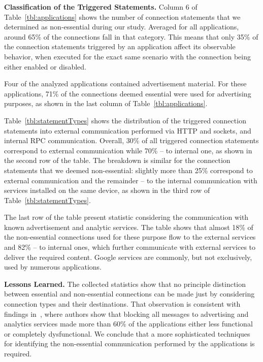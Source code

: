 \vspace{0.1in}
\noindent 
{\bf Classification of the Triggered Statements.}
Column 6 of Table~\ref{tbl:applications} shows the number of connection statements that we determined as non-essential during our study. 
Averaged for all applications, around 65\% of the connections fall in that category. 
This means that only 35\% of the connection statements triggered by an application affect its observable behavior, 
when executed for the exact same scenario with the connection being either enabled or disabled. 

Four of the analyzed applications contained advertisement material. For these applications, 71\% of the connections deemed  essential were used for advertising purposes, as shown in the last column of Table~\ref{tbl:applications}.



Table~\ref{tbl:statementTypes} shows the distribution of the triggered connection statements 
into external communication performed via HTTP and sockets, and internal RPC communication. 
Overall, 30\% of all triggered connection statements correspond to external communication while 70\% -- to
internal one, as shown in the second row of the table.
The breakdown is similar for the connection statements that we deemed non-essential: slightly more than 25\%
correspond to external communication and the remainder -- to the internal communication with services installed on the same device, as shown in the third row of Table~\ref{tbl:statementTypes}.

The last row of the table present statistic considering the communication with known advertisement and analytic services. The table shows that almost 18\% of the non-essential connections used for these purpose flow to the external services and 82\% -- to internal ones, which further communicate with external services to deliver the required content. 
Google services are commonly, but not exclusively, used by numerous applications. 


\vspace{0.1in}
\noindent 
{\bf Lessons Learned.}
The collected statistics show that no principle distinction between essential and non-essential connections  
can be made just by considering connection types and their destinations. 
That observation is consistent with findings in~\cite{Hornyack:Han:Jung:Schechter:Wetherall:CCS11}, where authors 
show that blocking all messages to advertising and analytics services made more than 60\% of the applications either less functional or completely dysfunctional. 
We conclude that a more sophisticated 
techniques for identifying the non-essential communication performed by the applications is required. 

